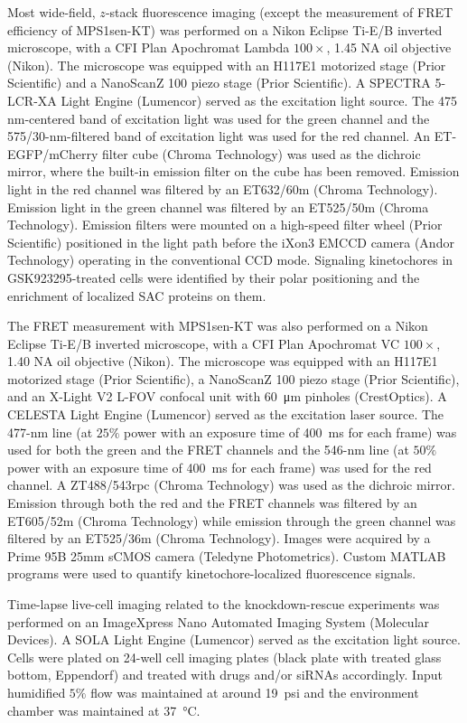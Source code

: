 Most wide-field, $z$-stack fluorescence imaging (except the measurement of FRET efficiency of MPS1sen-KT) was performed on a Nikon Eclipse Ti-E/B inverted microscope, with a CFI Plan Apochromat Lambda $100\times$, 1.45 NA oil objective (Nikon). The microscope was equipped with an H117E1 motorized stage (Prior Scientific) and a NanoScanZ 100 piezo stage (Prior Scientific). A SPECTRA 5-LCR-XA Light Engine (Lumencor) served as the excitation light source. The 475 nm-centered band of excitation light was used for the green channel and the 575/30-nm-filtered band of excitation light was used for the red channel. An ET-EGFP/mCherry filter cube (Chroma Technology) was used as the dichroic mirror, where the built-in emission filter on the cube has been removed. Emission light in the red channel was filtered by an ET632/60m (Chroma Technology). Emission light in the green channel was filtered by an ET525/50m (Chroma Technology). Emission filters were mounted on a high-speed filter wheel (Prior Scientific) positioned in the light path before the iXon3 EMCCD camera (Andor Technology) operating in the conventional CCD mode. Signaling kinetochores in GSK923295-treated cells were identified by their polar positioning and the enrichment of localized SAC proteins on them.

The FRET measurement with MPS1sen-KT was also performed on a Nikon Eclipse Ti-E/B inverted microscope, with a CFI Plan Apochromat VC $100\times$, 1.40 NA oil objective (Nikon). The microscope was equipped with an H117E1 motorized stage (Prior Scientific), a NanoScanZ 100 piezo stage (Prior Scientific), and an X-Light V2 L-FOV confocal unit with \SI{60}{\micro m} pinholes (CrestOptics). A CELESTA Light Engine (Lumencor) served as the excitation laser source. The 477-nm line (at $25\%$ power with an exposure time of \SI{400}{ms} for each frame) was used for both the green and the FRET channels and the 546-nm line (at $50\%$ power with an exposure time of \SI{400}{ms} for each frame) was used for the red channel. A ZT488/543rpc (Chroma Technology) was used as the dichroic mirror. Emission through both the red and the FRET channels was filtered by an ET605/52m (Chroma Technology) while emission through the green channel was filtered by an ET525/36m (Chroma Technology). Images were acquired by a Prime 95B 25mm sCMOS camera (Teledyne Photometrics). Custom MATLAB programs \cite{HeLaFRETGUI} were used to quantify kinetochore-localized fluorescence signals.

Time-lapse live-cell imaging related to the knockdown-rescue experiments was performed on an ImageXpress Nano Automated Imaging System (Molecular Devices). A SOLA Light Engine (Lumencor) served as the excitation light source. Cells were plated on 24-well cell imaging plates (black plate with treated glass bottom, Eppendorf) and treated with drugs and/or siRNAs accordingly. Input humidified $5\%$  flow was maintained at around \SI{19}{psi} and the environment chamber was maintained at \SI{37}{\celsius}.

